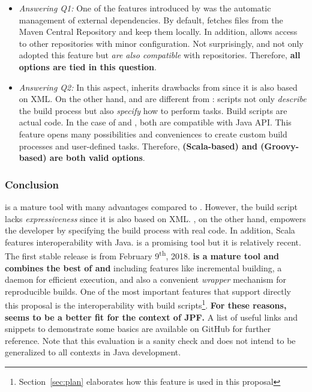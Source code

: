 \documentclass{article}
\begin{document}
\begin{itemize}
\item \emph{Answering Q1:}
One of the features introduced by \maven{} was the automatic management of
external dependencies.
By default, \maven{} fetches \jar{} files from the Maven Central
Repository\cite{page:mvncentral} and keep them locally.
In addition, \maven{} allows access to other repositories\cite{page:mvnrepo}
with minor configuration.
Not surprisingly, \gradle{} and \sbt{} not only adopted this feature but
\emph{are also compatible} with \maven{} repositories.
Therefore, \textbf{all options are tied in this question}.

\item \emph{Answering Q2:}
In this aspect, \maven{} inherits drawbacks from \ant{} since it is also based
on XML.
On the other hand, \gradle{} and \sbt{} are different from \maven{}: scripts
not only \emph{describe} the build process but also \emph{specify} how to
perform tasks.
Build scripts are actual code.
In the case of \sbt{} and \gradle{}, both are compatible with Java API.
This feature opens many possibilities and conveniences to create custom build
processes and user-defined tasks.
Therefore, \textbf{\sbt{} (Scala-based) and \gradle{} (Groovy-based) are both
valid options}.

\end{itemize}

\subsubsection*{Conclusion}
\maven{} is a mature tool with many advantages compared to \ant{}.
However, the build script lacks \emph{expressiveness} since it is also based on
XML.
\sbt{}, on the other hand, empowers the developer by specifying the build
process with real code.
In addition, Scala features interoperability with Java.
\sbt{} is a promising tool but it is relatively recent.
The first stable release is from February 9\textsuperscript{th},
2018\cite{page:sbt-release}.
\textbf{\gradle{} is a mature tool and combines the best of \maven{} and \sbt{}}
including features like incremental building, a daemon for efficient
execution\cite{page:gradle-daemon}, and also a convenient \emph{wrapper}
mechanism\cite{page:gradle-wrapper} for reproducible builds.
One of the most important \gradle{} features that support directly this
proposal is the interoperability with \ant{} build
scripts\cite{page:gradle-ant-support}\footnote{Section~\ref{sec:plan}
elaborates how this feature is used in this proposal}.
\textbf{For these reasons, \gradle{} seems to be a better fit for the context
of JPF.}
A list of useful links and snippets to demonstrate some \gradle{} basics are
available on GitHub\cite{page:gradle-labs} for further reference. 
Note that this evaluation is a sanity check and does not intend to be
generalized to all contexts in Java development.
\end{document}
